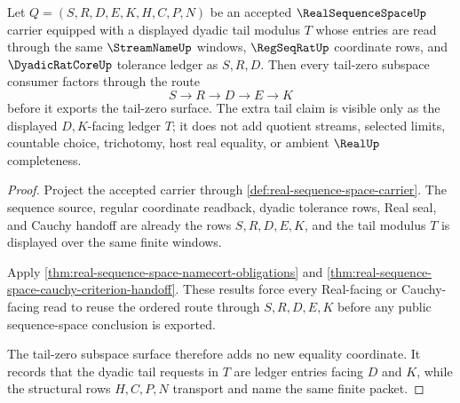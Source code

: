 \begin{theorem}
\label{thm:real-sequence-space-tail-zero-subspace}
Let $Q=(S,R,D,E,K,H,C,P,N)$ be an accepted $\RealSequenceSpaceUp$ carrier equipped with a displayed dyadic tail modulus $T$ whose entries are read through the same $\StreamNameUp$ windows, $\RegSeqRatUp$ coordinate rows, and $\DyadicRatCoreUp$ tolerance ledger as $S,R,D$. Then every tail-zero subspace consumer factors through the route
$$
S \longrightarrow R \longrightarrow D \longrightarrow E \longrightarrow K
$$
before it exports the tail-zero surface. The extra tail claim is visible only as the displayed $D,K$-facing ledger $T$; it does not add quotient streams, selected limits, countable choice, trichotomy, host real equality, or ambient $\RealUp$ completeness.
\end{theorem}
\begin{proof}
Project the accepted carrier through \autoref{def:real-sequence-space-carrier}. The sequence source, regular coordinate readback, dyadic tolerance rows, Real seal, and Cauchy handoff are already the rows $S,R,D,E,K$, and the tail modulus $T$ is displayed over the same finite windows.

Apply \autoref{thm:real-sequence-space-namecert-obligations} and \autoref{thm:real-sequence-space-cauchy-criterion-handoff}. These results force every Real-facing or Cauchy-facing read to reuse the ordered route through $S,R,D,E,K$ before any public sequence-space conclusion is exported.

The tail-zero subspace surface therefore adds no new equality coordinate. It records that the dyadic tail requests in $T$ are ledger entries facing $D$ and $K$, while the structural rows $H,C,P,N$ transport and name the same finite packet.
\end{proof}


\begin{closurestatus}{\RealSequenceSpaceUp}
  \theoryclosure{\seedClosure}
  \formalstatus{\unformalizedV}
\end{closurestatus}
